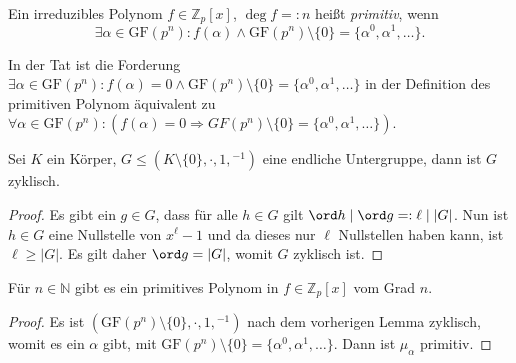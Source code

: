 
\begin{definition}
    Ein irreduzibles Polynom $f \in \mathbb{Z}_p[x]$, $\deg f =: n$ heißt \emph{primitiv}, wenn 
    $$\exists \alpha \in \mathrm{GF}(p^n): f(\alpha) \land \mathrm{GF}(p^n)\setminus\{0\} = \{\alpha^0, \alpha^1, \ldots \}. $$
\end{definition}

\begin{remark}
    In der Tat ist die Forderung $\exists \alpha\in \mathrm{GF}(p^n):f(\alpha)=0\land \mathrm{GF}(p^n)\setminus\{0\}=\{\alpha^0,\alpha^1,\ldots\}$ in der Definition des primitiven Polynom äquivalent zu $\forall\alpha\in\mathrm{GF}(p^n):(f(\alpha)=0\Rightarrow GF(p^n)\setminus\{0\}=\{\alpha^0,\alpha^1,\ldots\})$. 
\end{remark}

\begin{lemma}
    Sei $K$ ein Körper, $G \le (K \setminus \{0\}, \cdot, 1, {}^{-1})$ eine endliche Untergruppe, dann ist $G$ zyklisch.
\end{lemma}
\begin{proof}
    Es gibt ein $g \in G$, dass für alle $h \in G$ gilt $\ord h \mid \ord g =: \ell \mid \vert G \vert$. Nun ist $h \in G$ eine Nullstelle von $x^\ell-1$ und da dieses nur $\ell$ Nullstellen haben kann, ist $\ell \geq \vert G\vert$. Es gilt daher $\ord g = \vert G \vert$, womit $G$ zyklisch ist.
\end{proof}

\begin{corollary}
    Für $n \in \mathbb{N}$ gibt es ein primitives Polynom in $f \in \mathbb{Z}_p[x]$ vom Grad $n$.
\end{corollary}
\begin{proof}
    Es ist $(\mathrm{GF}(p^n)\setminus\{0\}, \cdot, 1, {}^{-1})$ nach dem vorherigen Lemma zyklisch, womit es ein $\alpha$ gibt, mit $\mathrm{GF}(p^n)\setminus\{0\} = \{\alpha^0, \alpha^1, \ldots\}$. Dann ist $\mu_\alpha$ primitiv.
\end{proof}

